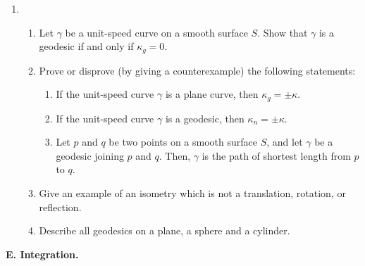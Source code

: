 \documentclass{article}
\begin{document}
\begin{enumerate}
\item
\begin{enumerate}
\item
Let $\gamma$ be a unit-speed curve on a smooth surface $S$. Show that  $\gamma$ is a geodesic if and only if $\kappa_g = 0$.

\item
Prove or disprove (by giving a counterexample) the following statements:
\begin{enumerate}


\item
If the unit-speed curve $\gamma$ is a plane curve, then $\kappa_g = \pm \kappa$.

\item
If the unit-speed curve $\gamma$ is a geodesic, then $\kappa_n = \pm \kappa$.

\item
Let $p$ and $q$ be two points on a smooth surface $S$, and let $\gamma$ be a geodesic joining $p$ and $q$. Then, $\gamma$ is the path of shortest length from $p$ to $q$.
\end{enumerate}

\item
Give an example of an isometry which is not a translation, rotation, or reflection. 

\item
Describe all geodesics on a plane, a sphere and a cylinder. 
\end{enumerate}
\end{enumerate}


\noindent
{\bf E. Integration.}
\end{document}

